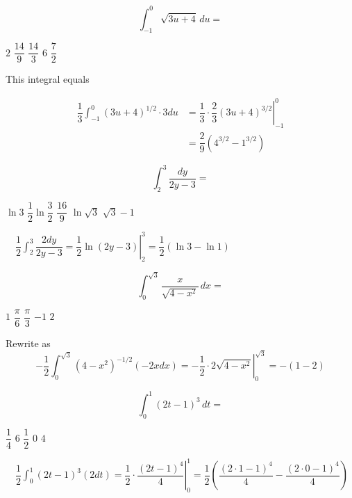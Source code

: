 \question
\[
\int_{-1}^{0} \sqrt{3 u+4}\,du=
\]
\begin{choices}
  \choice $2$
  \CorrectChoice $\dfrac{14}{9}$
  \choice $\dfrac{14}{3}$
  \choice $6$
  \choice $\dfrac{7}{2}$
\end{choices}
\begin{solution}
This integral equals


\[
\begin{aligned}
\dfrac{1}{3} \int_{-1}^{0}(3 u+4)^{1 / 2} \cdot 3 d u & =\left.\dfrac{1}{3} \cdot \dfrac{2}{3}(3 u+4)^{3 / 2}\right|_{-1} ^{0} \\
& =\dfrac{2}{9}\left(4^{3 / 2}-1^{3 / 2}\right)
\end{aligned}
\]


\end{solution}

\question
\[
\int_{2}^{3} \dfrac{d y}{2 y-3}=
\]
\begin{choices}
  \choice $\ln 3$
  \choice $\dfrac{1}{2} \ln \dfrac{3}{2}$
  \choice $\dfrac{16}{9}$
  \CorrectChoice $\ln \sqrt{3}$
  \choice $\sqrt{3}-1$
\end{choices}
\begin{solution}
$\quad \dfrac{1}{2} \int_{2}^{3} \dfrac{2 d y}{2 y-3}=\left.\dfrac{1}{2} \ln (2 y-3)\right|_{2} ^{3}=\dfrac{1}{2}(\ln 3-\ln 1)$
\end{solution}

\question
\[
\int_{0}^{\sqrt{3}} \dfrac{x}{\sqrt{4-x^{2}}}\,dx=
\]
\begin{choices}
  \CorrectChoice $1$
  \choice $\dfrac{\pi}{6}$
  \choice $\dfrac{\pi}{3}$
  \choice $-1$
  \choice $2$
\end{choices}
\begin{solution}
Rewrite as
\[
-\dfrac{1}{2} \int_{0}^{\sqrt{3}}\left(4-x^{2}\right)^{-1 / 2}(-2 x d x)=-\left.\dfrac{1}{2} \cdot 2 \sqrt{4-x^{2}}\right|_{0} ^{\sqrt{3}}=-(1-2)
\]
\end{solution}



\newpage





\question
\[
\int_{0}^{1}(2 t-1)^{3}\,dt=
\]
\begin{choices}
  \choice $\dfrac{1}{4}$
  \choice $6$
  \choice $\dfrac{1}{2}$
  \CorrectChoice $0$
  \choice $4$
\end{choices}
\begin{solution}
$\quad \dfrac{1}{2} \int_{0}^{1}(2 t-1)^{3}(2 d t)=\left.\dfrac{1}{2} \cdot \dfrac{(2 t-1)^{4}}{4}\right|_{0} ^{1}=\dfrac{1}{2}\left(\dfrac{(2 \cdot 1-1)^{4}}{4}-\dfrac{(2 \cdot 0-1)^{4}}{4}\right)$
\end{solution}

